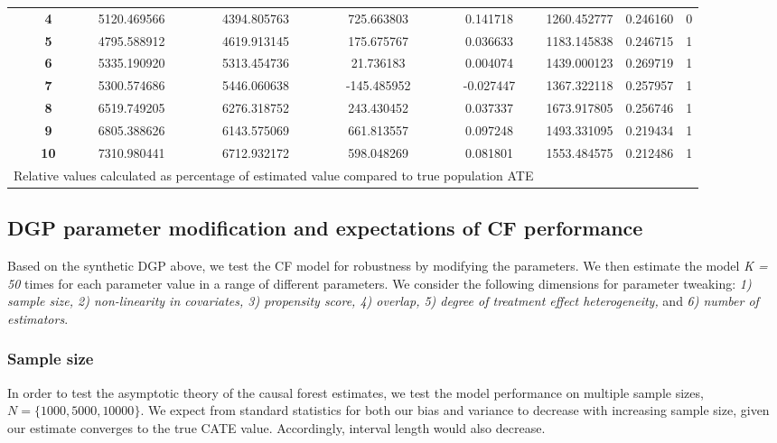 \documentclass[12pt]{article}
\begin{document}
\begin{table}[H]
{\begin{tabular}{lc|ccccccc}
\addlinespace
&\textbf{4} &5120.469566 & 4394.805763 & 725.663803 & 0.141718 & 1260.452777 & 0.246160 & 0 \\
\addlinespace
&\textbf{5} & 4795.588912 & 4619.913145 & 175.675767 & 0.036633 & 1183.145838 & 0.246715 & 1 \\
\addlinespace
&\textbf{6} & 5335.190920 & 5313.454736 & 21.736183 & 0.004074 & 1439.000123 & 0.269719 & 1 \\
\addlinespace
&\textbf{7} & 5300.574686 & 5446.060638 & -145.485952 & -0.027447 & 1367.322118 & 0.257957 & 1 \\\addlinespace
&\textbf{8} &6519.749205 & 6276.318752 & 243.430452 & 0.037337 & 1673.917805 & 0.256746 & 1 \\\addlinespace
&\textbf{9} & 6805.388626 & 6143.575069 & 661.813557 & 0.097248 & 1493.331095 & 0.219434 & 1 \\
\addlinespace
&\textbf{10} & 7310.980441 & 6712.932172 & 598.048269 & 0.081801 & 1553.484575 & 0.212486 & 1\\
\bottomrule
\multicolumn{6}{p{\textwidth}}{\footnotesize Relative values calculated as percentage of estimated value compared to true population ATE}\\
\end{tabular}}
\end{table}




\subsection{DGP parameter modification and expectations of CF performance}

Based on the synthetic DGP above, we test the CF model for robustness by
modifying the parameters. We then estimate the model \textit{K = 50} times for
each parameter value in a range of different parameters. We consider the
following dimensions for parameter tweaking: \textit{1) sample size, 2)
non-linearity in covariates, 3) propensity score, 4) overlap, 5) degree of
treatment effect heterogeneity,} and \textit{6) number of estimators}. 

\subsubsection{Sample size} 
In order to test the asymptotic theory of the causal forest estimates, we test
the model performance on multiple sample sizes, $ N = \{1000, 5000, 10000\}$. We
expect from standard statistics for both our bias and variance to decrease with
increasing sample size, given our estimate converges to the true CATE value.
Accordingly, interval length would also decrease.
\end{document}
